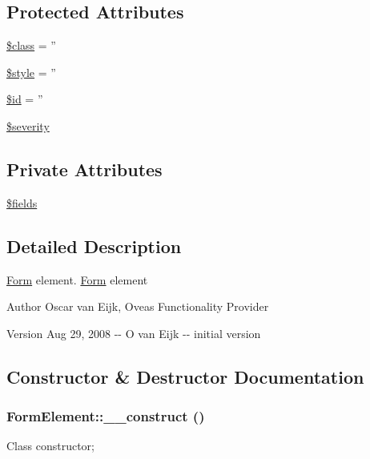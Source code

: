 \subsection*{Protected Attributes}
\begin{DoxyCompactItemize}
\item 
\hyperlink{classDOMElement_a5114a8be2c698c735ec897857156d252}{\$class} = ''
\item 
\hyperlink{classDOMElement_aa678fb06bb8ffd915c7e6ded8cfc58b6}{\$style} = ''
\item 
\hyperlink{classDOMElement_a8b2176f3ade70abc7b41603618a992c0}{\$id} = ''
\item 
\hyperlink{class__OWL_ad26b40a9dbbacb33e299b17826f8327c}{\$severity}
\end{DoxyCompactItemize}
\subsection*{Private Attributes}
\begin{DoxyCompactItemize}
\item 
\hyperlink{classFormElement_a0aeb56027873fd2d3c58022f6b6bf182}{\$fields}
\end{DoxyCompactItemize}


\subsection{Detailed Description}
\hyperlink{classForm}{Form} element. \hyperlink{classForm}{Form} element \begin{DoxyAuthor}{Author}
Oscar van Eijk, Oveas Functionality Provider 
\end{DoxyAuthor}
\begin{DoxyVersion}{Version}
Aug 29, 2008 -\/-\/ O van Eijk -\/-\/ initial version 
\end{DoxyVersion}


\subsection{Constructor \& Destructor Documentation}
\subsubsection[{\_\-\_\-construct}]{\setlength{\rightskip}{0pt plus 5cm}FormElement::\_\-\_\-construct ()}\label{classFormElement_af5ecddb99f71fcd2a7b52b2dbcd4c4c5}
Class constructor; 

